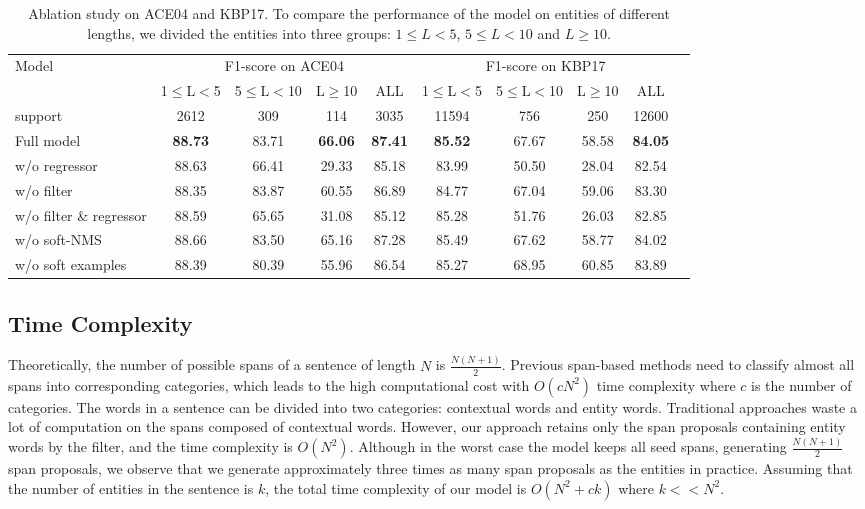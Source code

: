 \documentclass[11pt,a4paper]{article}
\begin{document}
\begin{table*}[h]
\centering
\small
\begin{tabular}{lccccccccc}
\toprule
\multirow{2}{*}{Model}   & \multicolumn{4}{c}{F1-score on ACE04}  & \multicolumn{4}{c}{F1-score on KBP17}  \\
 \cmidrule(lr){2-5}  \cmidrule(lr){6-9}  
& 1$\leq$L$<$5  & 5$\leq$L$<$10 & L$\geq$10 & ALL & 1$\leq$L$<$5  & 5$\leq$L$<$10 & L$\geq$10 & ALL  \\
\midrule
support & 2612 & 309 & 114 & 3035 & 11594 & 756 & 250 & 12600\\
\midrule
Full model   & \textbf{88.73} & 83.71 & \textbf{66.06} & \textbf{87.41} & \textbf{85.52} & 67.67 & 58.58 & \textbf{84.05}\\
\quad w/o regressor  & 88.63 & 66.41 & 29.33 & 85.18
& 83.99 & 50.50 & 28.04 & 82.54 \\

\quad w/o filter & 88.35 & 83.87 & 60.55 & 86.89
&   84.77 & 67.04 & 59.06 & 83.30\\ 


\quad w/o filter \& regressor & 88.59 & 65.65 & 31.08 & 85.12 
& 85.28 &51.76 &26.03 & 82.85 \\ 
\quad w/o soft-NMS & 88.66 & 83.50 & 65.16 & 87.28 & 85.49 & 67.62 & 58.77 & 84.02\\
\quad w/o soft examples  & 88.39 & 80.39 & 55.96 & 86.54
& 85.27 & 68.95 &60.85 &83.89\\ 
\bottomrule
\end{tabular}
\caption{Ablation study on ACE04 and KBP17. To compare the performance of the model on entities of different lengths, we divided the entities into three groups: $1\leq L<5$, $5\leq L<10$ and $L \geq 10$.}
\label{tab:ablation}
\end{table*}





\subsection{Time Complexity}

Theoretically, the number of possible spans of a sentence of length $N$ is $\frac{N(N+1)}{2}$. Previous span-based methods need to classify almost all spans into corresponding categories, which leads to the high computational cost with $O(cN^2)$ time complexity where $c$ is the number of categories. 
The words in a sentence can be divided into two categories: contextual words and entity words.
Traditional approaches waste a lot of computation on the spans composed of contextual words. However, our approach retains only the span proposals containing entity words by the filter, and the time complexity is $O(N^2)$. Although in the worst case the model keeps all seed spans, generating $\frac{N(N+1)}{2}$ span proposals, we observe that we generate approximately three times as many span proposals as the entities in practice. Assuming that the number of entities in the sentence is $k$, the total time complexity of our model is $O(N^2 + ck)$ where $k << N^2$.
\end{document}
